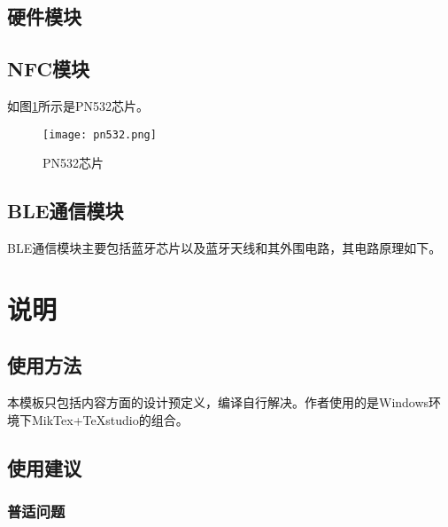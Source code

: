 \section{硬件模块}

\section{NFC模块}
如图\ref{pn532}所示是PN532芯片。

\begin{figure}[!h]
 \centering
 \texttt{[image: pn532.png]}
 \caption{PN532芯片}
 \label{pn532}
\end{figure}




\section{BLE通信模块}

BLE通信模块主要包括蓝牙芯片以及蓝牙天线和其外围电路，其电路原理如下。

\chapter{说明}


\section{使用方法}
\label{sec:usage}

本模板只包括内容方面的设计预定义，编译自行解决。作者使用的是Windows环境下MikTex+TeXstudio的组合。

\section{使用建议}
\label{sec:tips}

\subsection{普适问题}
\label{subsec:common}

